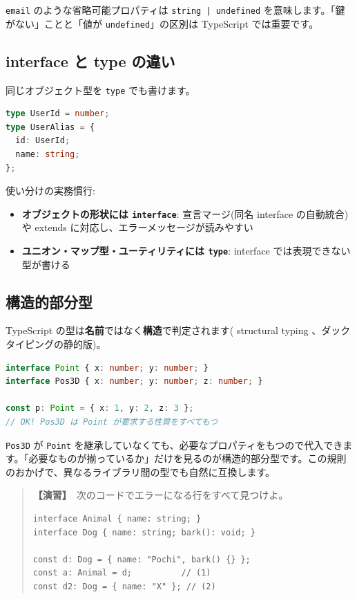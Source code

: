 \documentclass{article}
\begin{document}
\texttt{email} のような省略可能プロパティは \texttt{string | undefined} を意味します。「鍵がない」ことと「値が \texttt{undefined}」の区別は TypeScript では重要です。

\subsection{interface と type の違い}

同じオブジェクト型を \texttt{type} でも書けます。

\begin{lstlisting}[language=TypeScript]
type UserId = number;
type UserAlias = {
  id: UserId;
  name: string;
};
\end{lstlisting}

使い分けの実務慣行:
\begin{itemize}
\item \textbf{オブジェクトの形状には \texttt{interface}}: 宣言マージ(同名 interface の自動統合)や extends に対応し、エラーメッセージが読みやすい
\item \textbf{ユニオン・マップ型・ユーティリティには \texttt{type}}: interface では表現できない型が書ける
\end{itemize}

\subsection{構造的部分型}

TypeScript の型は\textbf{名前}ではなく\textbf{構造}で判定されます( structural typing 、ダックタイピングの静的版)。

\begin{lstlisting}[language=TypeScript]
interface Point { x: number; y: number; }
interface Pos3D { x: number; y: number; z: number; }

const p: Point = { x: 1, y: 2, z: 3 };
// OK! Pos3D は Point が要求する性質をすべてもつ
\end{lstlisting}

\texttt{Pos3D} が \texttt{Point} を継承していなくても、必要なプロパティをもつので代入できます。「必要なものが揃っているか」だけを見るのが構造的部分型です。この規則のおかげで、異なるライブラリ間の型でも自然に互換します。

\begin{quote}
\textbf{【演習】}\ 次のコードでエラーになる行をすべて見つけよ。
\begin{verbatim}
interface Animal { name: string; }
interface Dog { name: string; bark(): void; }

const d: Dog = { name: "Pochi", bark() {} };
const a: Animal = d;          // (1)
const d2: Dog = { name: "X" }; // (2)
\end{verbatim}
\end{quote}
\end{document}
